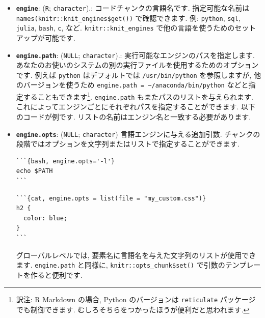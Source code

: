 \documentclass[
  11pt,
  lualatex,
  ja=standard]{bxjsreport}
\newenvironment{Shaded}{\begin{snugshade}}{\end{snugshade}}
\newcommand{\AttributeTok}[1]{\textcolor[rgb]{0.77,0.63,0.00}{#1}}
\newcommand{\FunctionTok}[1]{\textcolor[rgb]{0.00,0.00,0.00}{#1}}
\newcommand{\NormalTok}[1]{#1}
\newcommand{\SpecialCharTok}[1]{\textcolor[rgb]{0.00,0.00,0.00}{#1}}
\newcommand{\StringTok}[1]{\textcolor[rgb]{0.31,0.60,0.02}{#1}}
\begin{document}
\begin{itemize}
\item
  \textbf{\texttt{engine}}: (\texttt{\textquotesingle{}R\textquotesingle{}}; \texttt{character}).: コードチャンクの言語名です. 指定可能な名前は \texttt{names(knitr::knit\_engines\$get())} で確認できます. 例: \texttt{python}, \texttt{sql}, \texttt{julia}, \texttt{bash}, \texttt{c}, など. \texttt{knitr::knit\_engines} で他の言語を使うためのセットアップが可能です.
\item
  \textbf{\texttt{engine.path}}: (\texttt{NULL}; \texttt{character}).: 実行可能なエンジンのパスを指定します. あなたのお使いのシステムの別の実行ファイルを使用するためのオプションです. 例えば \texttt{python} はデフォルトでは \texttt{/usr/bin/python} を参照しますが, 他のバージョンを使うため \texttt{engine.path = \textquotesingle{}\textasciitilde{}/anaconda/bin/python\textquotesingle{}} などと指定することもできます\footnote{訳注: R Markdown の場合, Python のバージョンは \texttt{reticulate} パッケージでも制御できます. むしろそちらをつかったほうが便利だと思われます.}. \texttt{engine.path} もまたパスのリストを与えられます. これによってエンジンごとにそれぞれパスを指定することができます. 以下のコードが例です. リストの名前はエンジン名と一致する必要があります.

\begin{Shaded}
\end{Shaded}
\item
  \textbf{\texttt{engine.opts}}: (\texttt{NULL}; \texttt{character}) 言語エンジンに与える追加引数. チャンクの段階ではオプションを文字列またはリストで指定することができます.

\begin{verbatim}
```{bash, engine.opts='-l'}
echo $PATH
```
\end{verbatim}

\begin{verbatim}
```{cat, engine.opts = list(file = "my_custom.css")}
h2 {
  color: blue;
}
```
\end{verbatim}

  グローバルレベルでは, 要素名に言語名を与えた文字列のリストが使用できます. \texttt{engine.path} と同様に, \texttt{knitr::opts\_chunk\$set()} で引数のテンプレートを作ると便利です.


\end{itemize}
\end{document}
